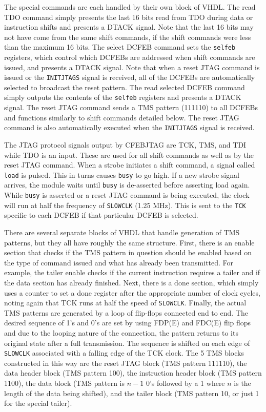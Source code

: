 \documentclass[10pt,a4paper]{article}
\begin{document}
The special commands are each handled by their own block of VHDL. The read TDO command simply presents the last 16 bits read from TDO during data or instruction shifts and presents a DTACK signal. Note that the last 16 bits may not have come from the same shift commands, if the shift commands were less than the maximum 16 bits. The select DCFEB command sets the \texttt{selfeb} registers, which control which DCFEBs are addressed when shift commands are issued, and presents a DTACK signal. Note that when a reset JTAG command is issued or the \texttt{INITJTAGS} signal is received, all of the DCFEBs are automatically selected to broadcast the reset pattern. The read selected DCFEB command simply outputs the contents of the \texttt{selfeb} registers and presents a DTACK signal. The reset JTAG command sends a TMS pattern (111110) to all DCFEBs and functions similarly to shift commands detailed below. The reset JTAG command is also automatically executed when the \texttt{INITJTAGS} signal is received.

The JTAG protocol signals output by CFEBJTAG are TCK, TMS, and TDI while TDO is an input. These are used for all shift commands as well as by the reset JTAG command. When a strobe initiates a shift command, a signal called \texttt{load} is pulsed. This in turns causes \texttt{busy} to go high. If a new strobe signal arrives, the module waits until \texttt{busy} is de-asserted before asserting load again. While \texttt{busy} is asserted or a reset JTAG command is being executed, the  clock will run at half the frequency of \texttt{SLOWCLK} (1.25 MHz). This is sent to the \texttt{TCK} specific to each DCFEB if that particular DCFEB is selected.

There are several separate blocks of VHDL that handle generation of TMS patterns, but they all have roughly the same structure. First, there is an enable section that checks if the TMS pattern in question should be enabled based on the type of command issued and what has already been transmitted. For example, the tailer enable checks if the current instruction requires a tailer and if the data
section has already finished. Next, there is a done section, which simply uses a counter to set a done register after the appropriate number of clock cycles, noting again that TCK runs at half the speed of \texttt{SLOWCLK}. Finally, the actual TMS patterns are generated by a loop of flip-flops connected end to end. The desired sequence of 1's and 0's are set by using FDP(E) and FDC(E) flip flops and due to the looping nature of the connection, the pattern returns to its original state after a full transmission. The sequence is shifted on each edge of \texttt{SLOWCLK} associated with a falling edge of the TCK clock. The 5 TMS blocks constructed in this way are the reset JTAG block (TMS pattern 111110), the data header block (TMS pattern 100), the instruction header block (TMS pattern 1100), the data block (TMS pattern is $n-1$ 0's followed by a 1 where $n$ is the length of the data being shifted), and the tailer block (TMS pattern 10, or just 1 for the special tailer).
\end{document}
